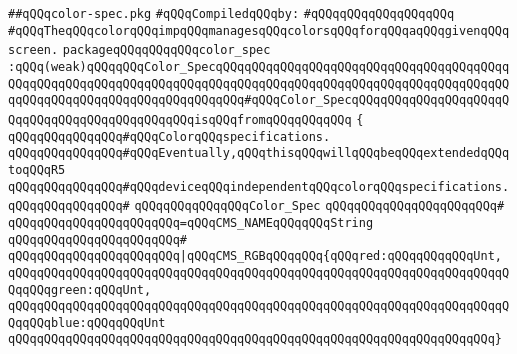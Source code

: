 \label{src/lib/x-kit/xclient/src/window/color-spec.pkg}
\verb|##qQQqcolor-spec.pkg|\newline
\newline
\verb|#qQQqCompiledqQQqby:|\newline
\verb|#qQQqqQQqqQQqqQQqqQQq|\newline
\newline
\newline
\verb|#qQQqTheqQQqcolorqQQqimpqQQqmanagesqQQqcolorsqQQqforqQQqaqQQqgivenqQQqscreen.|\newline
\newline
\verb|packageqQQqqQQqqQQqcolor_spec|\newline
\verb|:qQQq(weak)qQQqqQQqColor_SpecqQQqqQQqqQQqqQQqqQQqqQQqqQQqqQQqqQQqqQQqqQQqqQQqqQQqqQQqqQQqqQQqqQQqqQQqqQQqqQQqqQQqqQQqqQQqqQQqqQQqqQQqqQQqqQQqqQQqqQQqqQQqqQQqqQQqqQQqqQQqqQQq#qQQqColor_SpecqQQqqQQqqQQqqQQqqQQqqQQqqQQqqQQqqQQqqQQqqQQqqQQqisqQQqfromqQQqqQQqqQQq|\newline
\verb|{|\newline
\verb|qQQqqQQqqQQqqQQq#qQQqColorqQQqspecifications.|\newline
\verb|qQQqqQQqqQQqqQQq#qQQqEventually,qQQqthisqQQqwillqQQqbeqQQqextendedqQQqtoqQQqR5|\newline
\verb|qQQqqQQqqQQqqQQq#qQQqdeviceqQQqindependentqQQqcolorqQQqspecifications.|\newline
\verb|qQQqqQQqqQQqqQQq#|\newline
\verb|qQQqqQQqqQQqqQQqColor_Spec|\newline
\verb|qQQqqQQqqQQqqQQqqQQqqQQq#|\newline
\verb|qQQqqQQqqQQqqQQqqQQqqQQq=qQQqCMS_NAMEqQQqqQQqString|\newline
\verb|qQQqqQQqqQQqqQQqqQQqqQQq#|\newline
\verb|qQQqqQQqqQQqqQQqqQQqqQQq|\verb#|qQQqCMS_RGBqQQqqQQq{qQQqred:qQQqqQQqqQQqUnt,#\newline
\verb|qQQqqQQqqQQqqQQqqQQqqQQqqQQqqQQqqQQqqQQqqQQqqQQqqQQqqQQqqQQqqQQqqQQqqQQqqQQqgreen:qQQqUnt,|\newline
\verb|qQQqqQQqqQQqqQQqqQQqqQQqqQQqqQQqqQQqqQQqqQQqqQQqqQQqqQQqqQQqqQQqqQQqqQQqqQQqblue:qQQqqQQqUnt|\newline
\verb|qQQqqQQqqQQqqQQqqQQqqQQqqQQqqQQqqQQqqQQqqQQqqQQqqQQqqQQqqQQqqQQqqQQq}|\newline
